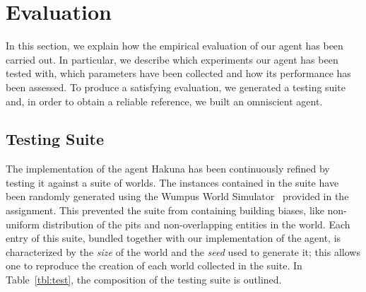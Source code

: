 \documentclass{llncs}
\begin{document}



\section{Evaluation}

In this section, we explain how the empirical evaluation of our agent has been carried out.
In particular, we describe which experiments our agent has been tested with, which parameters have been collected and how its performance has been assessed.
To produce a satisfying evaluation, we generated a testing suite and, in order to obtain a reliable reference, we built an omniscient agent.

\subsection{Testing Suite}

The implementation of the agent Hakuna has been continuously refined by testing it against a suite of worlds.
The instances contained in the suite have been randomly generated using the Wumpus World Simulator~\cite{WWS} provided in the assignment.
This prevented the suite from containing building biases, like non-uniform distribution of the pits and non-overlapping entities in the world.
Each entry of this suite, bundled together with our implementation of the agent, is characterized by the \emph{size} of the world and the \emph{seed} used to generate it; this allows one to reproduce the creation of each world collected in the suite.
In Table~\ref{tbl:test}, the composition of the testing suite is outlined.
\end{document}
